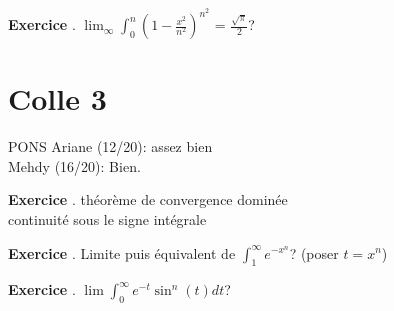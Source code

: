 \documentclass[10pt,a4paper]{article}
\newcounter{question}
\newcounter{exo}
\newenvironment{exo}{\vspace{0.5cm}\setcounter{question}{0}\addtocounter{exo}{1} \noindent \textbf{Exercice \theexo}. \normalsize }{\par}
\begin{document}
	\begin{exo}
		$\lim_\infty \int_{0}^{n} (1 - \frac{x^2}{n^2})^{n^2}$ = $\frac{\sqrt{\pi}}{2}$?
	\end{exo}
		
	\section*{Colle 3}
	\setcounter{exo}{0}
	PONS Ariane (12/20): assez bien\\
	Mehdy (16/20): Bien.\\
	
	\begin{exo}
		théorème de convergence dominée\\
		continuité sous le signe intégrale
	\end{exo}

	\begin{exo}
		Limite puis équivalent de $\int_{1}^{\infty} e^{-x^n}$? (poser $t = x^n$)
	\end{exo}

	\begin{exo}
		$\lim \int_{0}^{\infty} e^{-t} \sin^n(t) dt$?
	\end{exo}
\end{document}
